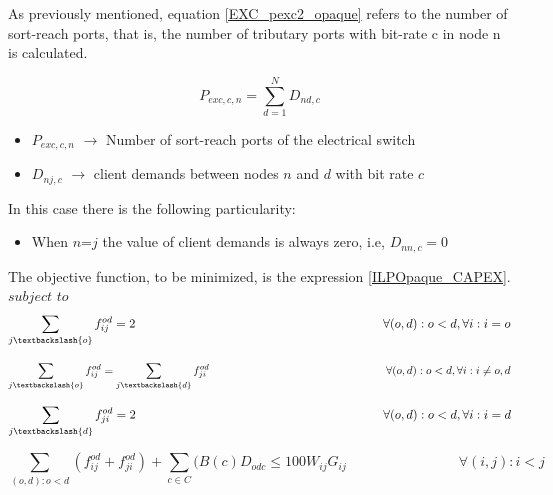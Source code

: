 \vspace{11pt}
As previously mentioned, equation \ref{EXC_pexc2_opaque} refers to the number of sort-reach ports, that is, the number of tributary ports with bit-rate c in node n is calculated.

\begin{equation}
P_{exc,c,n} = \sum_{d=1}^{N} D_{nd,c}
\label{EXC_pexc2_opaquep}
\end{equation}

\begin{itemize}
\item{$P_{exc,c,n}$	$\rightarrow$	Number of sort-reach ports of the electrical switch}
\item{$D_{nj,c}$	$\rightarrow$	client demands between nodes $n$ and $d$ with bit rate $c$}
\end{itemize}

\newpage
In this case there is the following particularity:

\begin{itemize}
  \item When $n$=$j$ the value of client demands is always zero, i.e, $D_{nn,c}=0$
\end{itemize}


\vspace{17pt}
The objective function, to be minimized, is the expression \ref{ILPOpaque_CAPEX}.\\

$subject$ $to$
\begin{equation}
\sum_{j\textbackslash \{o\}} f_{ij}^{od} = 2  \qquad \qquad \qquad \qquad \qquad \qquad \qquad \qquad \qquad \qquad
\forall(o,d) : o < d, \forall i: i = o
\label{ILPOpaque1}
\end{equation}

\begin{equation}
\sum_{j\textbackslash \{o\}} f_{ij}^{od} = \sum_{j\textbackslash \{d\}} f_{ji}^{od}   \qquad \qquad \qquad \qquad \qquad \qquad \qquad \qquad
\forall(o,d) : o < d, \forall i: i \neq o,d
\label{ILPOpaque2}
\end{equation}

\begin{equation}
\sum_{j\textbackslash \{d\}} f_{ji}^{od} = 2  \qquad \qquad \qquad \qquad \qquad \qquad \qquad \qquad \qquad \qquad
\forall(o,d) : o < d, \forall i: i = d
\label{ILPOpaque3}
\end{equation}

\begin{equation}
\sum_{(o,d):o<d} \left(f_{ij}^{od} + f_{ji}^{od}\right) + \sum_{c\in C} (B\left(c\right) D_{odc}\leq100 W_{ij} G_{ij} \qquad \qquad \qquad \qquad
\forall(i,j) : i < j
\label{ILPOpaque4}
\end{equation}

